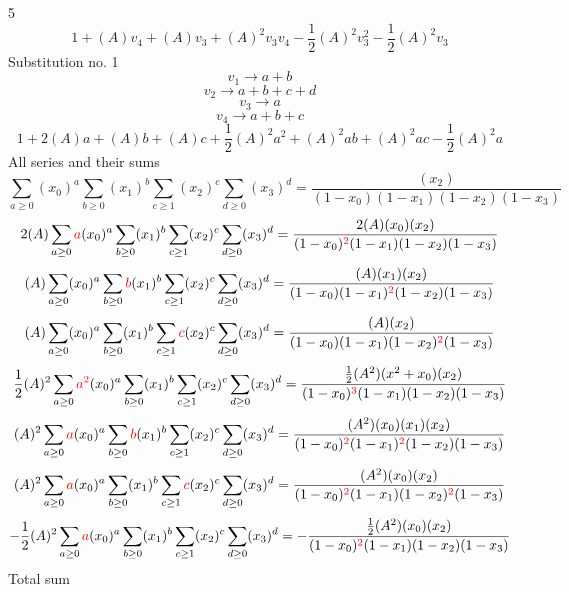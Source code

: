 \documentclass{article}
\begin{document}
                
5
\[1+(A)v_4+(A)v_3+(A)^2v_3v_4-\frac{1}{2}(A)^2v_3^{2}-\frac{1}{2}(A)^2v_3\]Substitution no. 1\[v_1\rightarrow{a+b}\]\[v_2\rightarrow{a+b+c+d}\]\[v_3\rightarrow{a}\]\[v_4\rightarrow{a+b+c}\]\[1+2(A)a+(A)b+(A)c+\frac{1}{2}(A)^2a^{2}+(A)^2ab+(A)^2ac-\frac{1}{2}(A)^2a\]All series and their sums\[\sum_{a\geq{0}}(x_0)^{a}\sum_{b\geq{0}}(x_1)^{b}\sum_{c\geq{1}}(x_2)^{c}\sum_{d\geq{0}}(x_3)^{d}=\frac{(x_2)}{(1-x_0)(1-x_1)(1-x_2)(1-x_3)}\]\[2(A)\sum_{a\geq{0}}\textcolor{red}{a}(x_0)^{a}\sum_{b\geq{0}}(x_1)^{b}\sum_{c\geq{1}}(x_2)^{c}\sum_{d\geq{0}}(x_3)^{d}=\frac{2(A)(x_0)(x_2)}{(1-x_0)^{\textcolor{red}{2}}(1-x_1)(1-x_2)(1-x_3)}\]\[(A)\sum_{a\geq{0}}(x_0)^{a}\sum_{b\geq{0}}\textcolor{red}{b}(x_1)^{b}\sum_{c\geq{1}}(x_2)^{c}\sum_{d\geq{0}}(x_3)^{d}=\frac{(A)(x_1)(x_2)}{(1-x_0)(1-x_1)^{\textcolor{red}{2}}(1-x_2)(1-x_3)}\]\[(A)\sum_{a\geq{0}}(x_0)^{a}\sum_{b\geq{0}}(x_1)^{b}\sum_{c\geq{1}}\textcolor{red}{c}(x_2)^{c}\sum_{d\geq{0}}(x_3)^{d}=\frac{(A)(x_2)}{(1-x_0)(1-x_1)(1-x_2)^{\textcolor{red}{2}}(1-x_3)}\]\[\frac{1}{2}(A)^{2}\sum_{a\geq{0}}\textcolor{red}{a^{2}}(x_0)^{a}\sum_{b\geq{0}}(x_1)^{b}\sum_{c\geq{1}}(x_2)^{c}\sum_{d\geq{0}}(x_3)^{d}=\frac{\frac{1}{2}(A^{2})(x^{2}+x_0)(x_2)}{(1-x_0)^{\textcolor{red}{3}}(1-x_1)(1-x_2)(1-x_3)}\]\[(A)^{2}\sum_{a\geq{0}}\textcolor{red}{a}(x_0)^{a}\sum_{b\geq{0}}\textcolor{red}{b}(x_1)^{b}\sum_{c\geq{1}}(x_2)^{c}\sum_{d\geq{0}}(x_3)^{d}=\frac{(A^{2})(x_0)(x_1)(x_2)}{(1-x_0)^{\textcolor{red}{2}}(1-x_1)^{\textcolor{red}{2}}(1-x_2)(1-x_3)}\]\[(A)^{2}\sum_{a\geq{0}}\textcolor{red}{a}(x_0)^{a}\sum_{b\geq{0}}(x_1)^{b}\sum_{c\geq{1}}\textcolor{red}{c}(x_2)^{c}\sum_{d\geq{0}}(x_3)^{d}=\frac{(A^{2})(x_0)(x_2)}{(1-x_0)^{\textcolor{red}{2}}(1-x_1)(1-x_2)^{\textcolor{red}{2}}(1-x_3)}\]\[-\frac{1}{2}(A)^{2}\sum_{a\geq{0}}\textcolor{red}{a}(x_0)^{a}\sum_{b\geq{0}}(x_1)^{b}\sum_{c\geq{1}}(x_2)^{c}\sum_{d\geq{0}}(x_3)^{d}=-\frac{\frac{1}{2}(A^{2})(x_0)(x_2)}{(1-x_0)^{\textcolor{red}{2}}(1-x_1)(1-x_2)(1-x_3)}\]
Total sum
\end{document}
